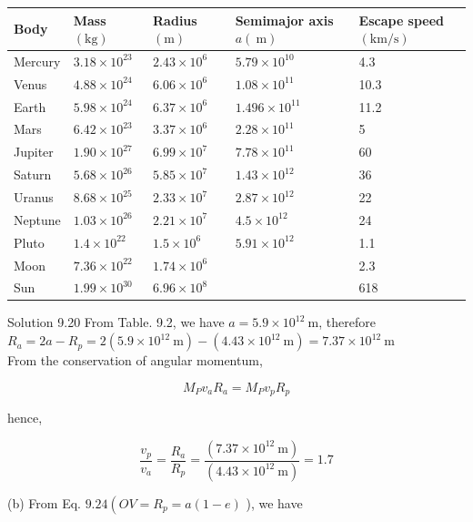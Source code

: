 \documentclass[10pt]{article}
\begin{document}
\begin{center}
\begin{tabular}{l|l|l|l|l}
\hline
Body & Mass $(\mathrm{kg})$ & Radius $(\mathrm{m})$ & Semimajor axis $a(\mathrm{~m})$ & Escape speed $(\mathrm{km} / \mathrm{s})$ \\
\hline
Mercury & $3.18 \times 10^{23}$ & $2.43 \times 10^{6}$ & $5.79 \times 10^{10}$ & 4.3 \\
\hline
Venus & $4.88 \times 10^{24}$ & $6.06 \times 10^{6}$ & $1.08 \times 10^{11}$ & 10.3 \\
\hline
Earth & $5.98 \times 10^{24}$ & $6.37 \times 10^{6}$ & $1.496 \times 10^{11}$ & 11.2 \\
\hline
Mars & $6.42 \times 10^{23}$ & $3.37 \times 10^{6}$ & $2.28 \times 10^{11}$ & 5 \\
\hline
Jupiter & $1.90 \times 10^{27}$ & $6.99 \times 10^{7}$ & $7.78 \times 10^{11}$ & 60 \\
\hline
Saturn & $5.68 \times 10^{26}$ & $5.85 \times 10^{7}$ & $1.43 \times 10^{12}$ & 36 \\
\hline
Uranus & $8.68 \times 10^{25}$ & $2.33 \times 10^{7}$ & $2.87 \times 10^{12}$ & 22 \\
\hline
Neptune & $1.03 \times 10^{26}$ & $2.21 \times 10^{7}$ & $4.5 \times 10^{12}$ & 24 \\
\hline
Pluto & $1.4 \times 10^{22}$ & $1.5 \times 10^{6}$ & $5.91 \times 10^{12}$ & 1.1 \\
\hline
Moon & $7.36 \times 10^{22}$ & $1.74 \times 10^{6}$ &  & 2.3 \\
\hline
Sun & $1.99 \times 10^{30}$ & $6.96 \times 10^{8}$ &  & 618 \\
\hline
\end{tabular}
\end{center}

Solution 9.20 From Table. 9.2, we have $a=5.9 \times 10^{12} \mathrm{~m}$, therefore\\
$R_{a}=2 a-R_{p}=2\left(5.9 \times 10^{12} \mathrm{~m}\right)-\left(4.43 \times 10^{12} \mathrm{~m}\right)=7.37 \times 10^{12} \mathrm{~m}$\\
From the conservation of angular momentum,

$$
M_{P} v_{a} R_{a}=M_{P} v_{p} R_{p}
$$

hence,

$$
\frac{v_{p}}{v_{a}}=\frac{R_{a}}{R_{p}}=\frac{\left(7.37 \times 10^{12} \mathrm{~m}\right)}{\left(4.43 \times 10^{12} \mathrm{~m}\right)}=1.7
$$

(b) From Eq. $9.24\left(O V=R_{p}=a(1-e)\right.$ ), we have
\end{document}

